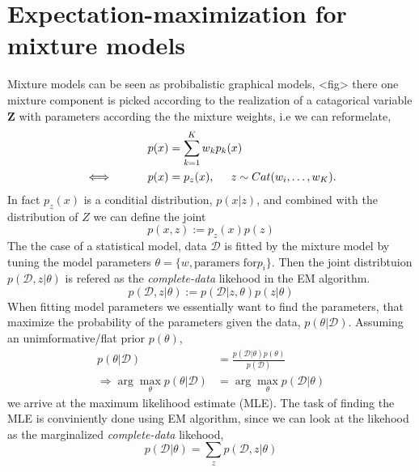 \newpage
\section{Expectation-maximization for mixture models}
Mixture models can be seen as probibalistic graphical models, <fig> there one mixture component is
picked according to the realization of a catagorical variable $\textbf{Z}$ with parameters according
the the mixture weights, i.e we can reformelate, 
\begin{align*}
    p(x) &= \sum_{k=1}^K w_k p_k(x)\\
   \iff \hspace*{1cm} p(x) &= p_z(x), \hspace*{0.5cm} z \sim Cat(w_i, \dots, w_K).
\end{align*}
In fact $p_z(x)$ is a conditial distribution, $p(x|z)$, and combined with the distribution
of $Z$ we can define the joint 
$$p(x,z):=p_z(x)p(z)$$
The the case of a statistical model, data $\mathcal{D}$ is fitted by the mixture model 
by tuning the model parameters $\theta = \{w, \text{paramers for} p_i\}$. Then the joint
distribtuion $p(\mathcal{D},z| \theta)$ is refered as the \textit{complete-data} likehood in the EM algorithm. 
$$p(\mathcal{D},z|\theta):=p(\mathcal{D}|z,\theta)p(z|\theta)$$ 
When fitting model parameters we essentially want to find the parameters, that maximize the probability of
the parameters given the data, $p(\theta|\mathcal{D})$. Assuming an
unimformative/flat prior $p(\theta)$, 
\begin{align*}
p(\theta|\mathcal{D})&= \frac{p(\mathcal{D}|\theta)p(\theta)}{p(\mathcal{D})}\\
\Rightarrow  \arg\max_{\theta} p(\theta|\mathcal{D}) &= \arg\max_{\theta} p(\mathcal{D}|\theta)
\end{align*}
we arrive at the maximum likelihood estimate (MLE). The task of finding the MLE is conviniently
done using EM algorithm, since we can look at the likehood as the marginalized
\textit{complete-data} likehood, 
$$p(\mathcal{D}|\theta) = \sum_z p(\mathcal{D}, z|\theta)$$


